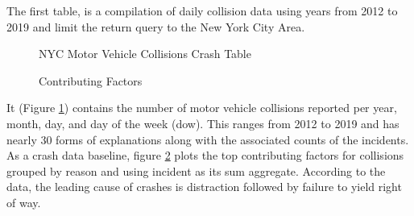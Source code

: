 \documentclass[conference]{IEEEtran}
\begin{document}
The first table, is a compilation of daily collision data using years from 2012 to 2019 and limit the return query to the New York City Area. 
\begin{figure}[bth]
	\centering
	\caption{NYC Motor Vehicle Collisions Crash Table}
	\label{fig:mvtable}
\end{figure}
\begin{figure}[bth]
	\centering
	\caption{Contributing Factors}
	\label{fig:crashPlot}
\end{figure}
It (Figure \ref{fig:mvtable}) contains the number of motor vehicle collisions reported per year, month, day, and day of the week (dow). This ranges from 2012 to 2019 and has nearly 30 forms of explanations along with the associated counts of the incidents.  As a crash data baseline, figure \ref{fig:crashPlot} plots the top contributing factors for collisions grouped by reason and using incident as its sum aggregate. According to the data, the leading cause of crashes is distraction followed by failure to yield right of way. 
\end{document}
